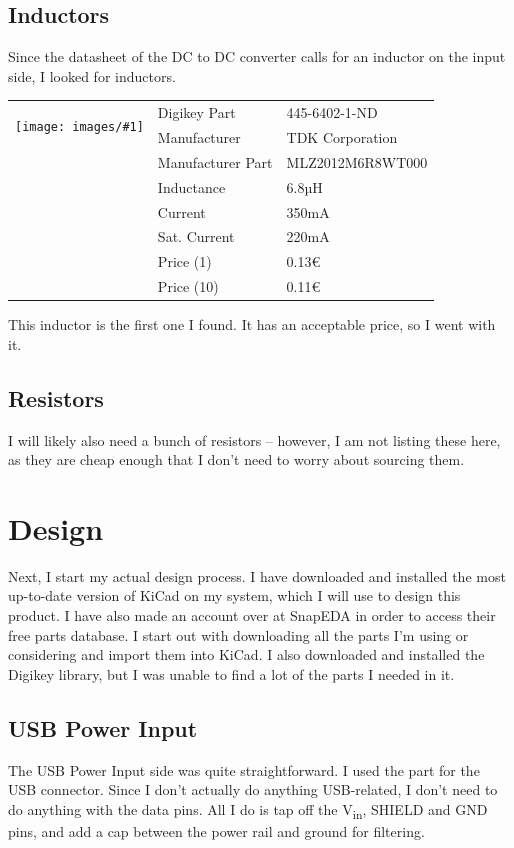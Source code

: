 \documentclass[a4paper]{article}
\makeatletter
\newenvironment{partdisplay}[1]{
\begin{center}
\begin{tabular}{@{}p{3cm}p{3cm}p{4.5cm}@{}}
\multirow{2}{3cm}{\texttt{[image: images/\#1]}}}{
\end{tabular}
\end{center}}
\makeatother
\begin{document}
\subsection{Inductors}

Since the datasheet of the DC to DC converter calls for an inductor on the input side, I looked for inductors. 

\begin{partdisplay}{MFG_MLZ2012}
& Digikey Part & 445-6402-1-ND\\
& Manufacturer & TDK Corporation\\
& Manufacturer Part & MLZ2012M6R8WT000\\
& Inductance & 6.8µH\\
& Current & 350mA\\
& Sat. Current & 220mA\\
& Price (1) & 0.13€\\
& Price (10) & 0.11€\\
\end{partdisplay}

This inductor is the first one I found. It has an acceptable price, so I went with it.

\subsection{Resistors}

I will likely also need a bunch of resistors -- however, I am not listing these here, as they are cheap enough that I don't need to worry about sourcing them.

\section{Design}

Next, I start my actual design process. I have downloaded and installed the most up-to-date version of KiCad on my system, which I will use to design this product. I have also made an account over at SnapEDA in order to access their free parts database. I start out with downloading all the parts I'm using or considering and import them into KiCad. I also downloaded and installed the Digikey library, but I was unable to find a lot of the parts I needed in it.

\subsection{USB Power Input}

The USB Power Input side was quite straightforward. I used the part for the USB connector. Since I don't actually do anything USB-related, I don't need to do anything with the data pins. All I do is tap off the V\textsubscript{in}, SHIELD and GND pins, and add a cap between the power rail and ground for filtering.
\end{document}
